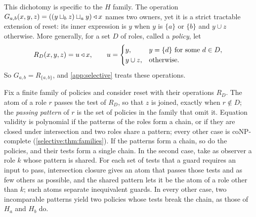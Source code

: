 This dichotomy is specific to the $H$ family. The operation $G_{a,b}(x,y,z)=((y\sqcup_b z)\sqcup_a y)\mathbin{\triangleleft} x$ names two owners, yet it is a strict tractable extension of reset: its inner expression is $y$ when $y$ is $\{a\}$ or $\{b\}$ and $y\cup z$ otherwise. More generally, for a set $D$ of roles, called a \emph{policy}, let
\begin{equation}\label{owner:eq:policy}
 R_D(x,y,z)=u\mathbin{\triangleleft} x,\qquad u=\begin{cases}y,&y=\{d\}\text{ for some }d\in D,\\y\cup z,&\text{otherwise}.\end{cases}
\end{equation} So $G_{a,b}=R_{\{a,b\}}$, and \cref{app:selective} treats these operations.

Fix a finite family of policies and consider reset with their operations $R_D$. The atom of a role $r$ passes the test of $R_D$, so that $z$ is joined, exactly when $r\notin D$; the \emph{passing pattern} of $r$ is the set of policies in the family that omit it. Equation validity is polynomial if the patterns of the roles
form a chain, or if they are closed under intersection and two roles share a pattern;
every other case is coNP-complete
(\cref{selective:thm:families}). If the patterns form a chain, so do the policies, and their tests form a single chain. In the second case, take as observer a role $k$ whose pattern is shared. For each set of tests that a guard requires an input to pass, intersection closure gives an atom that passes those tests and as few others as possible, and the shared pattern lets it be the atom of a role other than $k$; such atoms separate inequivalent guards. In every other case, two incomparable patterns yield two policies whose tests break the chain, as those of $H_a$ and $H_b$ do.
